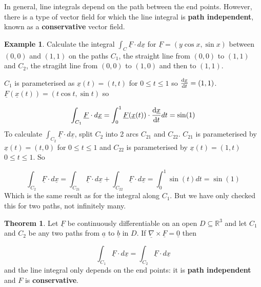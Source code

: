 \documentclass[12pt,a4paper]{article}
\theoremstyle{definition}
\newtheorem{theorem}[definition]{Theorem}
\newtheorem{example}[definition]{Example}
\begin{document}
In general, line integrals depend on the path between the end points. However, there is a type of vector field for which the line integral is \textbf{path independent}, known as a \textbf{conservative} vector field.

\begin{example}
	Calculate the integral $\int_C \underline{F} \cdot d\underline{x}$ for $\underline{F} = (y \cos x, \sin x)$ between $(0, 0)$ and $(1, 1)$ on the paths $C_1$, the straight line from $(0, 0)$ to $(1, 1)$ and $C_2$, the stragiht line from $(0, 0)$ to $(1, 0)$ and then to $(1, 1)$.

	$C_1$ is parameterised as $\underline{x}(t) = (t, t)$ for $0 \le t \le 1$ so $\diff{\underline{x}}{t} = (1, 1)$. $\underline{F}(\underline{x}(t)) = (t \cos t, \sin t)$ so

	\[ \int_{C_1} \underline{F} \cdot d \underline{x} = \int_0^1 \underline{F}(\underline{x}(t)) \cdot \diff{\underline{x}}{t} dt = \sin(1) \]
	To calculate $\int_{C_2} \underline{F} \cdot d \underline{x}$, split $C_2$ into 2 arcs $C_{21}$ and $C_{22}$. $C_{21}$ is parameterised by $\underline{x}(t) = (t, 0)$ for $0 \le t \le 1$ and $C_{22}$ is parameterised by $\underline{x}(t) = (1, t)$ $0 \le t \le 1$. So

	\[ \int_{C_2} \underline{F} \cdot d \underline{x} = \int_{C_{21}} \underline{F} \cdot d \underline{x} + \int_{C_{22}} \underline{F} \cdot d \underline{x} = \int_0^1 \sin(t) dt = \sin(1) \]
	Which is the same result as for the integral along $C_1$. But we have only checked this for two paths, not infinitely many.
\end{example}

\begin{theorem}
	Let $\underline{F}$ be continuously differentiable on an open $D \subseteq \mathbb{R}^3$ and let $C_1$ and $C_2$ be any two paths from $\underline{a}$ to $\underline{b}$ in $D$. If $\underline{\nabla} \times \underline{F} = \underline{0}$ then
	
	\[ \int_{C_1} \underline{F} \cdot d\underline{x} = \int_{C_2} \underline{F} \cdot d\underline{x} \]
	and the line integral only depends on the end points: it is \textbf{path independent} and $F$ is \textbf{conservative}.
\end{theorem}
	
\end{document}
